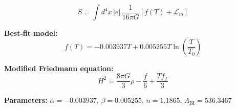 
\begin{equation}
  S = \int d^4x \, |e| \, \frac{1}{16\pi G} \left[ f(T) + \mathcal{L}_m \right]
\end{equation}

\textbf{Best-fit model:}
\begin{equation}
  f(T) = -0.003937 T + 0.005255 T \ln\!\left(\frac{T}{T_0}\right)
\end{equation}

\textbf{Modified Friedmann equation:}
\begin{equation}
  H^2 = \frac{8\pi G}{3} \rho - \frac{f}{6} + \frac{T f_T}{3}
\end{equation}

\textbf{Parameters:}
$\alpha = -0.003937$, \quad
$\beta = 0.005255$, \quad
$n = 1.1865$, \quad
$\Lambda_{\text{BI}} = 536.3467$